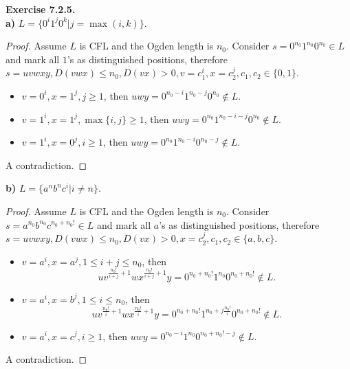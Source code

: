 \documentclass[a4paper]{article}
\newtheorem*{proof}{Proof}
\newenvironment{exercise}[1]{
	\par
	\noindent\textbf{Exercise #1.}\quad
}{
	\par
	\bigskip
}
\begin{document}
\begin{exercise}{7.2.5} \hspace{0pt}\\
\textbf{a)} $L=\{0^i1^j0^k|j=\max(i,k)\}$.
    \begin{proof}
        Assume $L$ is CFL and the Ogden length is $n_0$.
        Consider $s=0^{n_0}1^{n_0}0^{n_0}\in L$ and mark all $1$'s as distinguished positions, therefore
        $s=uvwxy,D(vwx)\leqslant n_0,D(vx)>0,v=c_1^i,x=c_2^j,c_1,c_2\in\{0,1\}$.
        \begin{itemize}
            \item $v=0^i,x=1^j,j\geqslant 1$, then $uwy=0^{n_0-i}1^{n_0-j}0^{n_0}\notin L$.
            \item $v=1^i,x=1^j,\max\{i,j\}\geqslant 1$, then $uwy=0^{n_0}1^{n_0-i-j}0^{n_0}\notin L$.
            \item $v=1^i,x=0^j,i\geqslant 1$, then $uwy=0^{n_0}1^{n_0-i}0^{n_0-j}\notin L$.
        \end{itemize}
        A contradiction.
    \end{proof}
\textbf{b)} $L=\{a^nb^nc^i|i\neq n\}$.
    \begin{proof}
        Assume $L$ is CFL and the Ogden length is $n_0$.
        Consider $s=a^{n_0}b^{n_0}c^{n_0+n_0!}\in L$ and mark all $a$'s as distinguished positions, therefore
        $s=uvwxy,D(vwx)\leqslant n_0,D(vx)>0,x=c_2^j,c_1,c_2\in\{a,b,c\}$.
        \begin{itemize}
            \item $v=a^i,x=a^j,1\leqslant i+j\leqslant n_0$, then
                $$
                uv^{\frac{n_0!}{i+j}+1}wx^{\frac{n_0!}{i+j}+1}y=0^{n_0+n_0!}1^{n_0}0^{n_0+n_0!}\notin L.
                $$
            \item $v=a^i,x=b^j,1\leqslant i\leqslant n_0$, then
                $$
                uv^{\frac{n_0!}{i}+1}wx^{\frac{n_0!}{i}+1}y=0^{n_0+n_0!}1^{n_0+j\frac{n_0!}{i}}0^{n_0+n_0!}\notin L.
                $$
            \item $v=a^i,x=c^j,i\geqslant 1$, then $uwy=0^{n_0-i}1^{n_0}0^{n_0+n_0!-j}\notin L$.
        \end{itemize}
        A contradiction.
    \end{proof}
\end{exercise}
\end{document}
